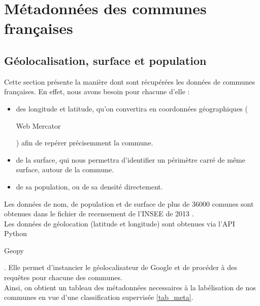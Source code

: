 \documentclass{book}
\begin{document}
\chapter{Métadonnées des communes françaises}

\section{Géolocalisation, surface et population}

Cette section présente la manière dont sont récupérées les données de communes françaises. En effet, nous avons besoin pour chacune d'elle  :
\begin{itemize}
  \item des longitude et latitude, qu'on convertira en coordonnées géographiques (\begin{itshape}Web Mercator\end{itshape}) afin de repérer précisemment la commune.
  \item de la surface, qui nous permettra d'identifier un périmètre carré de même surface, autour de la commune.
  \item de sa population, ou de sa densité directement.
\end{itemize}

Les données de nom, de population et de surface de plus de 36000 comunes sont obtenues dans le fichier de recensement de l'INSEE de 2013 \cite{insee_pop2013}.\\
Les données de géolocation (latitude et longitude) sont obtenues via l'API Python \begin{itshape}Geopy\end{itshape} \cite{geopy}. Elle permet d'instancier 
le géolocalisateur de Google et de procéder à des requêtes pour chacune des communes.\\

Ainsi, on obtient un tableau des métadonnées necessaires à la labélisation de nos communes en vue d'une classification supervisée \ref{tab_meta}.
\end{document}
